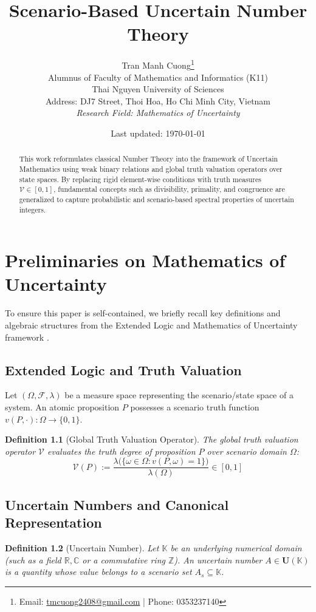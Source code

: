 \documentclass[a4paper,14pt, twoside]{memoir}
\title{\textbf{Scenario-Based Uncertain Number Theory}}
\author{
	Tran Manh Cuong\thanks{Email: \href{mailto:tmcuong2408@gmail.com}{tmcuong2408@gmail.com} | Phone: 0353237140} \\[0.5em]
	\small Alumnus of Faculty of Mathematics and Informatics (K11)
	\\ Thai Nguyen University of Sciences \\
	\small Address: DJ7 Street, Thoi Hoa, Ho Chi Minh City, Vietnam \\
	\small \textit{Research Field: Mathematics of Uncertainty}
}
\date{Last updated: \today}
\newtheorem{definition}{Definition}[chapter]
\newcommand{\tsbd}[1]{\mathbf{U}(\mathbb{#1})}
\newcommand{\ddclmd}{\mathcal{V}} %
\begin{document}
	
	\maketitle
	
	\begin{abstract}
		This work reformulates classical Number Theory into the framework of Uncertain Mathematics using weak binary relations and global truth valuation operators over state spaces. By replacing rigid element-wise conditions with truth measures $\ddclmd \in [0,1]$, fundamental concepts such as divisibility, primality, and congruence are generalized to capture probabilistic and scenario-based spectral properties of uncertain integers.
	\end{abstract}
	
	\chapter{Preliminaries on Mathematics of Uncertainty}
	
	To ensure this paper is self-contained, we briefly recall key definitions and algebraic structures from the Extended Logic and Mathematics of Uncertainty framework \cite{Tran2026}.
	
	\section{Extended Logic and Truth Valuation}
	Let $(\Omega, \mathcal{F}, \lambda)$ be a measure space representing the scenario/state space of a system. An atomic proposition $P$ possesses a scenario truth function $v(P, \cdot) : \Omega \to \{0, 1\}$.
	
	\begin{definition}[Global Truth Valuation Operator]
		The global truth valuation operator $\ddclmd$ evaluates the truth degree of proposition $P$ over scenario domain $\Omega$:
		\[
		\ddclmd(P) := \frac{\lambda\big(\{\omega \in \Omega : v(P, \omega) = 1\}\big)}{\lambda(\Omega)} \in [0, 1]
		\]
	\end{definition}
	
	\section{Uncertain Numbers and Canonical Representation}
	
	\begin{definition}[Uncertain Number]
		Let $\mathbb{K}$ be an underlying numerical domain (such as a field $\mathbb{R}, \mathbb{C}$ or a commutative ring $\mathbb{Z}$). An uncertain number $A \in \tsbd{K}$ is a quantity whose value belongs to a scenario set $A_s \subseteq \mathbb{K}$.
	\end{definition}
	
\end{document}
